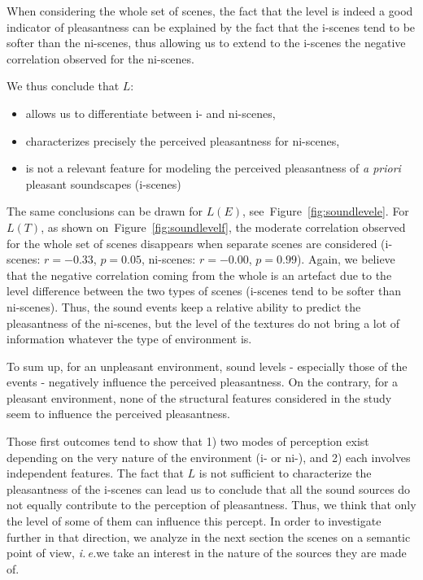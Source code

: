 \documentclass[preprint,12pt]{elsarticle}
\newcommand{\ie}{\emph{i.\,e.}}
\begin{document}
When considering the whole set of scenes, the fact that the level is indeed a good indicator of pleasantness can be explained by the fact that the i-scenes tend to be softer than the ni-scenes, thus allowing us to extend to the i-scenes the negative correlation observed for the ni-scenes.

We thus conclude that $L$:

\begin{itemize}
\item allows us to differentiate between i- and ni-scenes,
\item characterizes precisely the perceived pleasantness for ni-scenes,
\item is not a relevant feature for modeling the perceived pleasantness of \textit{a priori} pleasant soundscapes (i-scenes)
\end{itemize}

The same conclusions can be drawn for $L(E)$, see~Figure~\ref{fig:soundlevele}. For $L(T)$, as shown on~Figure~\ref{fig:soundlevelf}, the moderate correlation observed for the whole set of scenes disappears when separate scenes are considered (i-scenes: $r=-0.33$, $p=0.05$, ni-scenes: $r=-0.00$, $p=0.99$). Again, we believe that the negative correlation coming from the whole is an artefact due to the level difference between the two types of scenes (i-scenes tend to be softer than ni-scenes). Thus, the sound events keep a relative ability to predict the pleasantness of the ni-scenes, but the level of the textures do not bring a lot of information whatever the type of environment is.

To sum up, for an unpleasant environment, sound levels - especially those of the events - negatively influence the perceived pleasantness. On the contrary, for a pleasant environment, none of the structural features considered in the study seem to influence the perceived pleasantness.

Those first outcomes tend to show that 1) two modes of perception exist depending on the very nature of the environment (i- or ni-), and 2) each involves independent features. The fact that $L$ is not sufficient to characterize the pleasantness of the i-scenes can lead us to conclude that all the sound sources do not equally contribute to the perception of pleasantness. Thus, we think that only the level of some of them can influence this percept. In order to investigate further in that direction, we analyze in the next section the scenes on a semantic point of view, \ie we take an interest in the nature of the sources they are made of.
\end{document}

